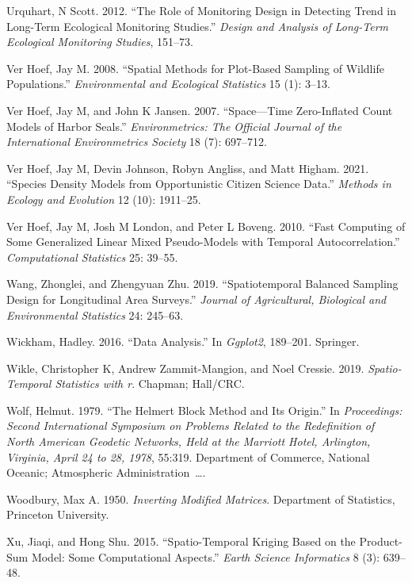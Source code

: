\documentclass[smallextended]{svjour3}       %
\newlength{\cslhangindent}
\newlength{\cslentryspacingunit} %
\newenvironment{CSLReferences}[2] %
 {%
  \setlength{\parindent}{0pt}
  \ifodd #1
  \let\oldpar\par
  \def\par{\hangindent=\cslhangindent\oldpar}
  \fi
  \setlength{\parskip}{#2\cslentryspacingunit}
 }%
 {}
\begin{document}
\begin{CSLReferences}{1}{0}
\leavevmode{}%
Urquhart, N Scott. 2012. {``The Role of Monitoring Design in Detecting
Trend in Long-Term Ecological Monitoring Studies.''} \emph{Design and
Analysis of Long-Term Ecological Monitoring Studies}, 151--73.

\leavevmode{}%
Ver Hoef, Jay M. 2008. {``Spatial Methods for Plot-Based Sampling of
Wildlife Populations.''} \emph{Environmental and Ecological Statistics}
15 (1): 3--13.

\leavevmode{}%
Ver Hoef, Jay M, and John K Jansen. 2007. {``Space---Time Zero-Inflated
Count Models of Harbor Seals.''} \emph{Environmetrics: The Official
Journal of the International Environmetrics Society} 18 (7): 697--712.

\leavevmode{}%
Ver Hoef, Jay M, Devin Johnson, Robyn Angliss, and Matt Higham. 2021.
{``Species Density Models from Opportunistic Citizen Science Data.''}
\emph{Methods in Ecology and Evolution} 12 (10): 1911--25.

\leavevmode{}%
Ver Hoef, Jay M, Josh M London, and Peter L Boveng. 2010. {``Fast
Computing of Some Generalized Linear Mixed Pseudo-Models with Temporal
Autocorrelation.''} \emph{Computational Statistics} 25: 39--55.

\leavevmode{}%
Wang, Zhonglei, and Zhengyuan Zhu. 2019. {``Spatiotemporal Balanced
Sampling Design for Longitudinal Area Surveys.''} \emph{Journal of
Agricultural, Biological and Environmental Statistics} 24: 245--63.

\leavevmode{}%
Wickham, Hadley. 2016. {``Data Analysis.''} In \emph{Ggplot2}, 189--201.
Springer.

\leavevmode{}%
Wikle, Christopher K, Andrew Zammit-Mangion, and Noel Cressie. 2019.
\emph{Spatio-Temporal Statistics with r}. Chapman; Hall/CRC.

\leavevmode{}%
Wolf, Helmut. 1979. {``The Helmert Block Method and Its Origin.''} In
\emph{Proceedings: Second International Symposium on Problems Related to
the Redefinition of North American Geodetic Networks, Held at the
Marriott Hotel, Arlington, Virginia, April 24 to 28, 1978}, 55:319.
Department of Commerce, National Oceanic; Atmospheric
Administration~\ldots.

\leavevmode{}%
Woodbury, Max A. 1950. \emph{Inverting Modified Matrices}. Department of
Statistics, Princeton University.

\leavevmode{}%
Xu, Jiaqi, and Hong Shu. 2015. {``Spatio-Temporal Kriging Based on the
Product-Sum Model: Some Computational Aspects.''} \emph{Earth Science
Informatics} 8 (3): 639--48.

\end{CSLReferences}




\end{document}
